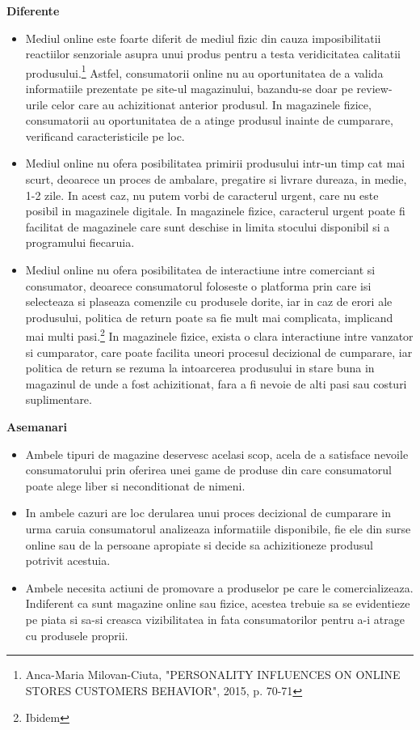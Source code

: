 \documentclass[a4paper, 12pt]{article}
\begin{document}
			\quad \textbf{Diferente}
			\begin{itemize}
				\item Mediul online este foarte diferit  de mediul fizic din cauza imposibilitatii reactiilor senzoriale asupra unui produs pentru a testa veridicitatea calitatii produsului.\footnote{Anca-Maria Milovan-Ciuta, "PERSONALITY INFLUENCES ON ONLINE STORES CUSTOMERS BEHAVIOR", 2015, p. 70-71} Astfel, consumatorii online nu au oportunitatea de a valida informatiile prezentate pe site-ul magazinului, bazandu-se doar pe review-urile celor care au achizitionat anterior produsul. In magazinele fizice, consumatorii au oportunitatea de a atinge produsul inainte de cumparare, verificand caracteristicile pe loc.
				\item Mediul online nu ofera posibilitatea primirii produsului intr-un timp cat mai scurt, deoarece un proces de ambalare, pregatire si livrare dureaza, in medie, 1-2 zile. In acest caz, nu putem vorbi de caracterul urgent, care nu este posibil in magazinele digitale. In magazinele fizice, caracterul urgent poate fi facilitat de magazinele care sunt deschise in limita stocului disponibil si a programului fiecaruia.
				\item Mediul online nu ofera posibilitatea de interactiune intre comerciant si consumator, deoarece consumatorul foloseste o platforma prin care isi selecteaza si plaseaza comenzile cu produsele dorite, iar in caz de erori ale produsului, politica de return poate sa fie mult mai complicata, implicand mai multi pasi.\footnote{Ibidem} In magazinele fizice, exista o clara interactiune intre vanzator si cumparator, care poate facilita uneori procesul decizional de cumparare, iar politica de return se rezuma la intoarcerea produsului in stare buna in magazinul de unde a fost achizitionat, fara a fi nevoie de alti pasi sau costuri suplimentare.
			\end{itemize}
			
			\quad \textbf{Asemanari}
			\begin{itemize}
				\item Ambele tipuri de magazine deservesc acelasi scop, acela de a satisface nevoile consumatorului prin oferirea unei game de produse din care consumatorul poate alege liber si neconditionat de nimeni.
				\item In ambele cazuri are loc derularea unui proces decizional de cumparare in urma caruia consumatorul analizeaza informatiile disponibile, fie ele din surse online sau de la persoane apropiate si decide sa achizitioneze produsul potrivit acestuia. 
				\item Ambele necesita actiuni de promovare a produselor pe care le comercializeaza. Indiferent ca sunt magazine online sau fizice, acestea trebuie sa se evidentieze pe piata si sa-si creasca vizibilitatea in fata consumatorilor pentru a-i atrage cu produsele proprii.
			\end{itemize}
\end{document}
